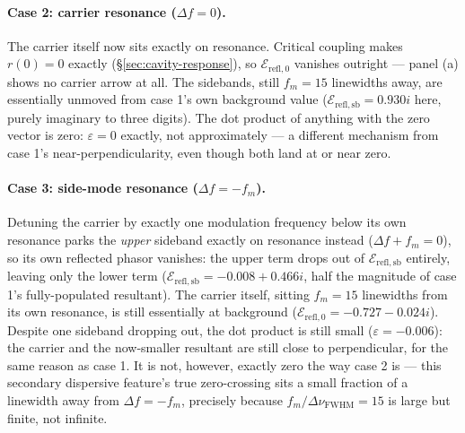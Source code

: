 \documentclass[9pt]{article}
\begin{document}
\paragraph{Case 2: carrier resonance ($\Delta f=0$).} The carrier itself
now sits exactly on resonance. Critical coupling makes $r(0)=0$ exactly
(\S\ref{sec:cavity-response}), so $\mathcal{E}_{\mathrm{refl},0}$ vanishes
outright --- panel (a) shows no carrier arrow at all. The sidebands, still
$f_m=15$ linewidths away, are essentially unmoved from case 1's own
background value ($\mathcal{E}_{\mathrm{refl,sb}}=0.930i$ here, purely
imaginary to three digits). The dot product of anything with the zero
vector is zero: $\varepsilon=0$ exactly, not approximately --- a different
mechanism from case 1's near-perpendicularity, even though both land at or
near zero.

\paragraph{Case 3: side-mode resonance ($\Delta f=-f_m$).} Detuning the
carrier by exactly one modulation frequency below its own resonance parks
the \emph{upper} sideband exactly on resonance instead
($\Delta f+f_m=0$), so its own reflected phasor vanishes: the upper term
drops out of $\mathcal{E}_{\mathrm{refl,sb}}$ entirely, leaving only the
lower term ($\mathcal{E}_{\mathrm{refl,sb}}=-0.008+0.466i$, half the
magnitude of case 1's fully-populated resultant). The carrier itself,
sitting $f_m=15$ linewidths from its own resonance, is still essentially at
background ($\mathcal{E}_{\mathrm{refl},0}=-0.727-0.024i$). Despite one
sideband dropping out, the dot product is still small
($\varepsilon=-0.006$): the carrier and the now-smaller resultant are still
close to perpendicular, for the same reason as case 1. It is not, however,
exactly zero the way case 2 is --- this secondary dispersive feature's true
zero-crossing sits a small fraction of a linewidth away from
$\Delta f=-f_m$, precisely because $f_m/\Delta\nu_{\mathrm{FWHM}}=15$ is
large but finite, not infinite.
\end{document}
